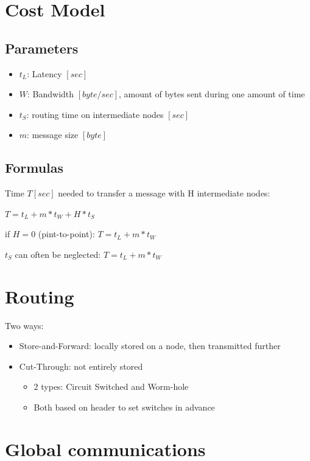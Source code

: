 \documentclass[11pt,a4paper]{report}
\begin{document}
\section{Cost Model}

\subsection{Parameters}


\begin{itemize}
    \item \(t_{L}\): Latency \([sec]\)
    \item \(W\): Bandwidth \([byte/sec]\), amount of bytes sent during one 
    amount of time
    \item \(t_{S}\): routing time on intermediate nodes \([sec]\)
    \item \(m\): message size \([byte]\)
\end{itemize}


\subsection{Formulas}

Time \(T [sec]\) needed to transfer a message with H intermediate nodes:

\(T = t_{L} + m * t_{W} + H * t_{S}\)

if \(H=0\) (pint-to-point): \(T = t_{L} + m * t_{W}\)

\(t_{S}\) can often be neglected: \(T = t_{L} + m * t_{W}\)

\section{Routing}

Two ways:

\begin{itemize}
    \item Store-and-Forward: locally stored on a node, then transmitted further
    \item Cut-Through: not entirely stored
    \begin{itemize}
        \item 2 types: Circuit Switched and Worm-hole
        \item Both based on header to set switches in advance
    \end{itemize}
\end{itemize}


\section{Global communications}
\end{document}
